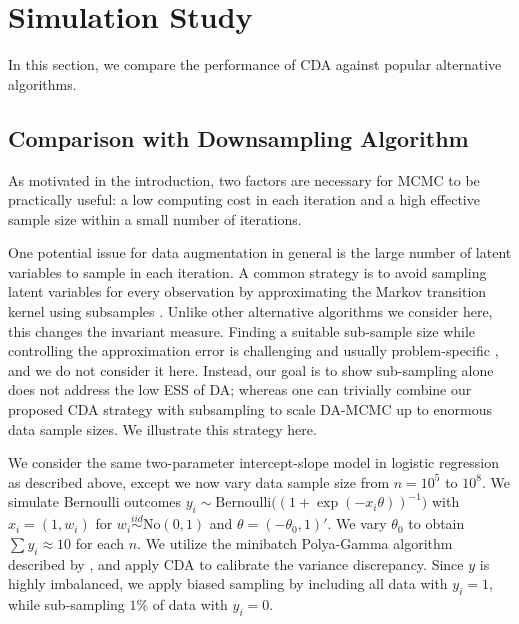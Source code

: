 \documentclass[twoside,11pt]{article}
\newcommand{\No}{\text{No}}
\newcommand{\Bern}{\text{Bernoulli}}
\newcommand{\1}{\mathbf 1}
\begin{document}
{\section{Simulation Study}


In this section, we compare the performance of CDA against popular alternative algorithms.

\subsection{Comparison with Downsampling Algorithm}
\label{sec:down_sampling}
As motivated in the introduction,  two factors are necessary for MCMC to be practically useful: a low computing cost  in each iteration and a high effective sample size within a small number of iterations. 

One potential issue for data augmentation in general is the large number of latent variables to sample in each iteration.  A common strategy is to {avoid sampling latent variables for
every observation by approximating the Markov transition kernel using subsamples} 
\citep{korattikara2014austerity,quiroz2016exact, bardenet2017markov}.  {Unlike other
alternative algorithms we consider here, this changes the invariant measure. Finding
a suitable sub-sample size while controlling the approximation
error is challenging and usually problem-specific \citep{johndrow2015approximations, rudolf2018perturbation}, and we do not consider it here. Instead, our goal is to show sub-sampling alone does not address the low ESS of DA; whereas }{one can trivially combine our proposed CDA
strategy with subsampling to scale DA-MCMC up to enormous data sample sizes.  We illustrate this strategy here.}

We consider the same two-parameter intercept-slope model in logistic regression
as described above, except we now vary data sample size from  $n=10^5$ to $10^8$. We simulate Bernoulli outcomes $y_i\sim \Bern\big(({1+\exp(-x_i\theta)})^{-1}\big)$ with $x_i=(1,w_i)$ for $w_i \stackrel{iid}{\sim} \No(0,1)$ and $\theta=(-\theta_0,1)'$. We vary $\theta_0$ to obtain $\sum{y_i} \approx
10$ for each $n$. We utilize the minibatch Polya-Gamma algorithm described by \cite{johndrow2015approximations},
and apply CDA to calibrate the variance discrepancy. Since $y$ is highly imbalanced, we apply biased sampling by including all data
with $y_i=1$, while sub-sampling $1\%$ of data with $y_i=0$. %

}
\end{document}
